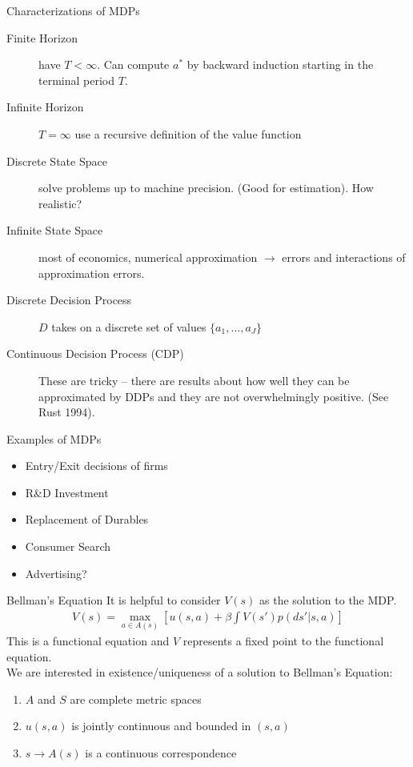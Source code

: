 \documentclass[aspectratio=169,11pt]{beamer}
\begin{document}
\begin{frame}{Characterizations of MDPs}
\begin{description}
\item[Finite Horizon] have $T < \infty$. Can compute $a^*$ by backward induction starting in the terminal period $T$.
\item[Infinite Horizon] $T=\infty$ use a recursive definition of the value function
\item[Discrete State Space] solve problems up to machine precision. (Good for estimation).  How realistic?
\item[Infinite State Space] most of economics, numerical approximation $\rightarrow$  errors and interactions of approximation errors.
\item [Discrete Decision Process] $D$ takes on a discrete set of values $\{a_1,\ldots,a_J\}$
\item[Continuous Decision Process (CDP)] These are tricky -- there are results about how well they can be approximated by DDPs and they are not overwhelmingly positive. (See Rust 1994).
\end{description}
\end{frame}

\begin{frame}{Examples of MDPs}
\begin{itemize}
\item Entry/Exit decisions of firms
\item R\&D Investment
\item Replacement of Durables
\item Consumer Search
\item Advertising?
\end{itemize}
\end{frame}

\begin{frame}{Bellman's Equation}
It is helpful to consider $V(s)$ as the solution to the MDP.  
\begin{eqnarray*}
V(s) = \max_{a \in A(s)} [ u(s,a) + \beta \int V(s') p(ds' | s,a)]
\end{eqnarray*}
This is a \alert{functional equation} and $V$ represents a \alert{fixed point} to the functional equation.\\
\vspace{0.5cm}
We are interested in existence/uniqueness of a solution to Bellman's Equation:
\begin{enumerate}
\item $A$ and $S$ are complete metric spaces
\item $u(s,a)$ is jointly continuous and bounded in $(s,a)$
\item $s \rightarrow A(s)$ is a continuous correspondence
\end{enumerate}
\end{frame}
\end{document}
